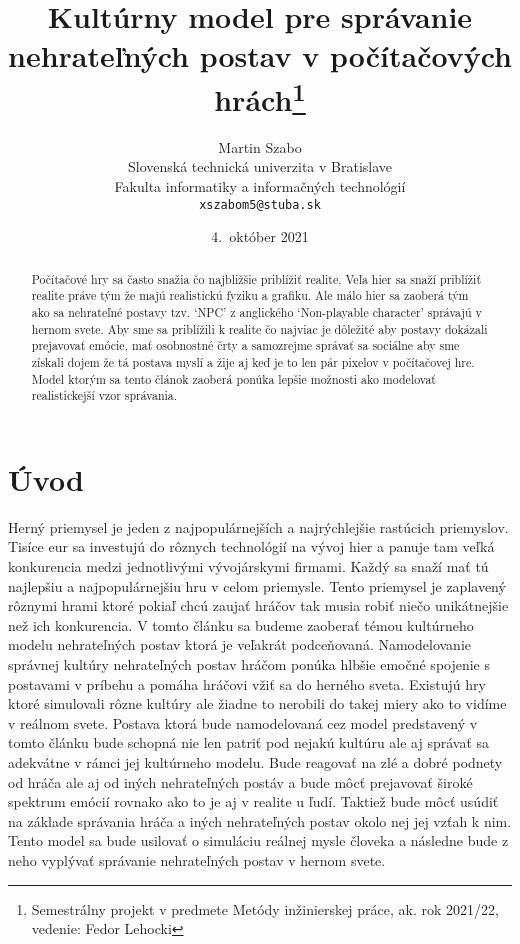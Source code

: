 \documentclass[10pt,twoside,slovak,a4paper]{article}
\title{Kultúrny model pre správanie nehrateľných postav v počítačových hrách\thanks{Semestrálny projekt v predmete Metódy inžinierskej práce, ak\@. rok 2021/22, vedenie: Fedor Lehocki}} %
\author{Martin Szabo\\[2pt]
	{\small Slovenská technická univerzita v Bratislave}\\
	{\small Fakulta informatiky a informačných technológií}\\
	{\small \texttt{xszabom5@stuba.sk}}
	}
\date{\small 4.\ október 2021} %
\begin{document}
\maketitle

\begin{abstract}

Počítačové hry sa často snažia čo najbližšie priblížiť realite. Veľa hier sa snaží priblížiť realite práve tým že 
majú realistickú fyziku a grafiku. Ale málo hier sa zaoberá tým ako sa nehrateľné postavy tzv. `NPC' z anglického
`Non-playable character' správajú v hernom svete. Aby sme sa priblížili k realite čo najviac je dôležité aby postavy
dokázali prejavovať emócie, mať osobnostné črty a samozrejme správať sa sociálne aby sme získali dojem že tá postava
myslí a žije aj keď je to len pár pixelov v počítačovej hre. Model ktorým sa tento článok zaoberá ponúka lepšie
možnosti ako modelovať realistickejší vzor správania.

\end{abstract}

\section{Úvod}

Herný priemysel je jeden z najpopulárnejších a najrýchlejšie rastúcich priemyslov.
Tisíce eur sa investujú do rôznych technológií na vývoj hier a panuje tam veľká konkurencia
medzi jednotlivými vývojárskymi firmami. Každý sa snaží mať tú najlepšiu a najpopulárnejšiu
hru v celom priemysle. Tento priemysel je zaplavený rôznymi hrami ktoré pokiaľ chcú zaujať hráčov
tak musia robiť niečo unikátnejšie než ich konkurencia. V tomto článku sa budeme zaoberať témou
kultúrneho modelu nehrateľných postav ktorá je veľakrát podceňovaná. Namodelovanie správnej kultúry
nehrateľných postav hráčom ponúka hlbšie emočné spojenie s postavami v príbehu a pomáha hráčovi
vžiť sa do herného sveta. Existujú hry ktoré simulovali rôzne kultúry ale žiadne to nerobili do takej 
miery ako to vidíme v reálnom svete. Postava ktorá bude namodelovaná cez model predstavený v 
tomto článku bude schopná nie len patriť pod nejakú kultúru ale aj správať sa adekvátne v rámci 
jej kultúrneho modelu. Bude reagovať na zlé a dobré podnety od hráča ale aj od iných nehrateľných 
postáv a bude môcť prejavovať široké spektrum emócií rovnako ako to je aj v realite u ľudí. Taktiež bude 
môcť usúdiť na základe správania hráča a iných nehrateľných postav okolo nej jej vzťah k nim. Tento model
sa bude usilovať o simuláciu reálnej mysle človeka a následne bude z neho vyplývať správanie nehrateľných
postav v hernom svete.
\end{document}
